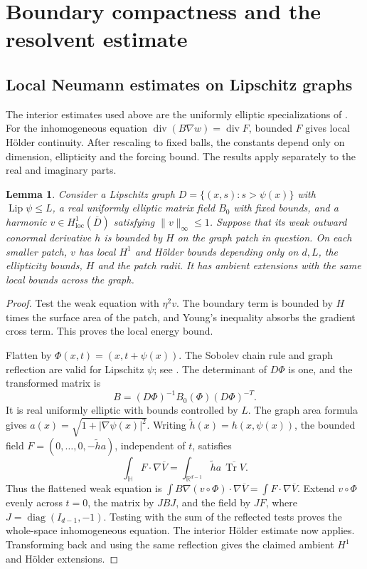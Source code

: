 \documentclass[11pt]{article}
\newtheorem{lemma}[theorem]{Lemma}
\newcommand{\R}{\mathbb R}
\newcommand{\Tr}{\operatorname{Tr}}
\newcommand{\diver}{\operatorname{div}}
\newcommand{\HH}{\mathbb H}
\newcommand{\norm}[1]{\lVert #1\rVert}
\newcommand{\abs}[1]{\lvert #1\rvert}
\begin{document}
\section{Boundary compactness and the resolvent estimate}

\subsection{Local Neumann estimates on Lipschitz graphs}

The interior estimates used above are the uniformly elliptic specializations
of \cite[Theorem 5.1 and Corollaries 5.4--5.5]{Trudinger}.
For the inhomogeneous equation $\diver(B\nabla w)=\diver F$, bounded $F$
gives local H\"older continuity. After rescaling to fixed balls, the
constants depend only on dimension, ellipticity and the forcing bound.
The results apply separately to the real and imaginary parts.

\begin{lemma}\label{lem:Neumann}
Consider a Lipschitz graph $D=\{(x,s):s>\psi(x)\}$ with
$\operatorname{Lip}\psi\leq L$, a real uniformly elliptic matrix field $B_0$
with fixed bounds, and a harmonic $v\in H^1_{\mathrm{loc}}(\overline D)$
satisfying $\norm v_\infty\leq1$. Suppose that its weak outward conormal
derivative $h$ is bounded by $H$ on the graph patch in question.
On each smaller patch, $v$ has local $H^1$ and H\"older bounds depending only
on $d,L$, the ellipticity bounds, $H$ and the patch radii. It has ambient
extensions with the same local bounds across the graph.
\end{lemma}

\begin{proof}
Test the weak equation with $\eta^2v$. The boundary term is bounded by
$H$ times the surface area of the patch, and Young's inequality absorbs the
gradient cross term. This proves the local energy bound.

Flatten by $\Phi(x,t)=(x,t+\psi(x))$. The Sobolev chain rule and graph
reflection are valid for Lipschitz $\psi$;
see \cite[arXiv version, Section 3.1 and Lemma 3.3]{Nittka}. The determinant of $D\Phi$ is one,
and the transformed matrix is
\[
 B=(D\Phi)^{-1}B_0(\Phi)(D\Phi)^{-T}.
\]
It is real uniformly elliptic with bounds controlled by $L$.
The graph area formula \cite[Section 3.3.4]{EvansGariepy} gives
$a(x)=\sqrt{1+\abs{\nabla\psi(x)}^2}$.
Writing $\widetilde h(x)=h(x,\psi(x))$, the bounded field
$F=(0,\ldots,0,-\widetilde h a)$, independent of $t$, satisfies
\[
 \int_\HH F\cdot\nabla\overline V
     =\int_{\R^{d-1}}\widetilde h a\,\overline{\Tr V}.
\]
Thus the flattened weak equation is
$\int B\nabla(v\circ\Phi)\cdot\nabla\overline V=\int F\cdot\nabla\overline V$.
Extend $v\circ\Phi$ evenly across $t=0$, the matrix by $JBJ$, and the field
by $JF$, where $J=\operatorname{diag}(I_{d-1},-1)$. Testing with the
sum of the reflected tests proves the
whole-space inhomogeneous equation. The interior H\"older estimate now
applies. Transforming back and using the same reflection gives the claimed
ambient $H^1$ and H\"older extensions.
\end{proof}
\end{document}
